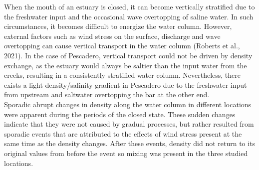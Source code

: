 \documentclass[tesis.tex]{subfiles}
\begin{document}



When the mouth of an estuary is closed, it can become vertically stratified due to the freshwater input and the occasional wave overtopping of saline water. In such circumstances, it becomes difficult to energize the water column. However, external factors such as wind stress on the surface, discharge and wave overtopping can cause vertical transport in the water column (Roberts et al., 2021). In the case of Pescadero, vertical transport could not be driven by density exchange, as the estuary would always be saltier than the input water from the creeks, resulting in a consistently stratified water column. Nevertheless, there exists a light density/salinity gradient in Pescadero due to the freshwater input from upstream and saltwater overtopping the bar at the other end.\\

Sporadic abrupt changes in density along the water column in different locations were apparent during the periods of the closed state. These sudden changes indicate that they were not caused by gradual processes, but rather resulted from sporadic events that are attributed to the effects of wind stress present at the same time as the density changes. After these events, density did not return to its original values from before the event so mixing was present in the three studied locations.\\
\end{document}
